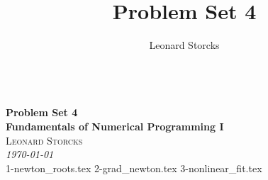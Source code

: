 \documentclass[a4paper, 12pt]{article}
\title{Problem Set 4}
\author{Leonard Storcks}
\theoremstyle{definition}
\begin{document}
\pagestyle{plain}
{\noindent\Huge\bf  \\[0.5\baselineskip] {\selectfont  Problem Set 4}}\\[2\baselineskip]
{ {\bf {}\selectfont Fundamentals of Numerical Programming I}\\
{\textsc{Leonard Storcks}} \\
{\textit{\selectfont     \today}}}
\\[1.4\baselineskip] 


{1-newton_roots.tex}
{2-grad_newton.tex}
{3-nonlinear_fit.tex}


\pagebreak
\thispagestyle{plain}
\printbibliography[title={References}]
\pagebreak

\end{document}
